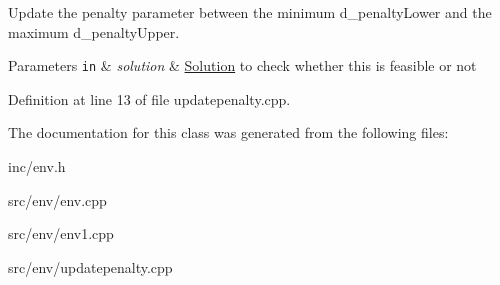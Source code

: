 Update the penalty parameter between the minimum d\+\_\+penalty\+Lower and the maximum d\+\_\+penalty\+Upper. 


\begin{DoxyParams}[1]{Parameters}
\mbox{\tt in}  & {\em solution} & \hyperlink{class_solution}{Solution} to check whether this is feasible or not \\
\hline
\end{DoxyParams}


Definition at line 13 of file updatepenalty.\+cpp.



The documentation for this class was generated from the following files\+:\begin{DoxyCompactItemize}
\item 
inc/env.\+h\item 
src/env/env.\+cpp\item 
src/env/env1.\+cpp\item 
src/env/updatepenalty.\+cpp\end{DoxyCompactItemize}
